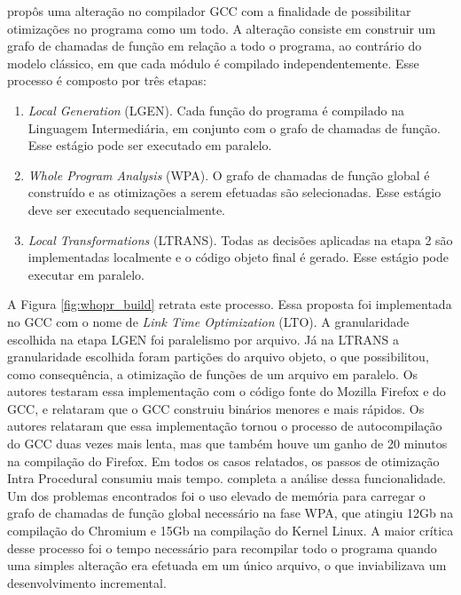 \cite{whoprgoogle} propôs uma alteração no
compilador GCC com a finalidade
de possibilitar otimizações no programa como um todo. A alteração consiste
em construir um grafo de chamadas de função em relação a todo o programa,
ao contrário do modelo clássico, em que cada módulo é compilado independentemente.
Esse processo é composto por três etapas:
\begin{enumerate}
    \item \textit{Local Generation } (LGEN). Cada função do programa é compilado
        na Linguagem Intermediária, em conjunto com o grafo de chamadas de função.
        Esse estágio pode ser executado em paralelo.

    \item \textit{Whole Program Analysis} (WPA). O grafo de chamadas de função global
        é construído e as otimizações a serem efetuadas são selecionadas. Esse estágio
        deve ser executado sequencialmente.

    \item \textit{Local Transformations} (LTRANS). Todas as decisões aplicadas na
        etapa 2 são implementadas localmente e o código objeto final é gerado.
        Esse estágio pode executar em paralelo.
\end{enumerate}

A Figura \ref{fig:whopr_build} retrata este processo. Essa proposta foi implementada
no GCC \citep{glek2010optimizing} com o nome de
\textit{Link Time Optimization} (LTO). A granularidade
escolhida na etapa LGEN foi paralelismo por arquivo. Já na LTRANS a granularidade
escolhida foram partições do arquivo objeto, o que possibilitou, como
consequência, a otimização de funções de um arquivo em paralelo. Os autores
testaram essa implementação com o
código fonte do Mozilla Firefox e do GCC, e relataram que o GCC construiu
binários menores e mais rápidos. Os autores relataram que essa implementação tornou
o processo de autocompilação do GCC duas vezes mais lenta,
mas que também houve um ganho de 20 minutos na compilação do Firefox. Em todos os
casos relatados, os passos de otimização Intra Procedural consumiu mais tempo.
\cite{livska2014optimizing} completa a análise dessa funcionalidade.
Um dos problemas encontrados foi o uso elevado de memória para carregar o grafo de
chamadas de função global necessário na fase WPA, que atingiu 12Gb na compilação do
Chromium e 15Gb na compilação do Kernel Linux. A maior crítica desse processo
foi o tempo necessário para recompilar todo o programa quando uma simples alteração
era efetuada em um único arquivo, o que inviabilizava um desenvolvimento incremental.

